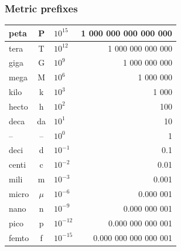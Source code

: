 \documentclass[aspectratio=169,xcolor=pdftex,dvipsnames]{beamer} %
\begin{document}
\begin{frame}
\frametitle{Metric prefixes}

\begin{tabular}{ | l | c | l | r | }
\hline
peta & P & $10^{15}$ & 1 000 000 000 000 000 \hspace{3.5cm} \\ \hline
tera & T & $10^{12}$ & 1 000 000 000 000 \hspace{3.5cm} \\ \hline
giga & G & $10^{9}$ & 1 000 000 000 \hspace{3.5cm} \\ \hline
mega & M & $10^{6}$ & 1 000 000 \hspace{3.5cm} \\ \hline
kilo & k & $10^{3}$ & 1 000  \hspace{3.5cm} \\ \hline
hecto & h & $10^{2}$ & 100 \hspace{3.5cm} \\ \hline
deca & da & $10^{1}$ & 10 \hspace{3.5cm} \\ \hline
-- & -- & $10^0$ & 1 \hspace{3.5cm} \\ \hline
deci & d & $10^{-1}$ &  0.1 \hspace{3.2cm} \\ \hline
centi & c & $10^{-2}$ & 0.01 \hspace{3cm} \\ \hline
mili & m & $10^{-3}$ & 0.001 \hspace{2.8cm} \\ \hline
micro & $\mu$ & $10^{-6}$ & 0.000 001 \hspace{2.1cm} \\ \hline
nano & n & $10^{-9}$ & 0.000 000 001 \hspace{1.4cm} \\ \hline
pico & p & $10^{-12}$ & 0.000 000 000 001 \hspace{0.7cm} \\ \hline
femto & f & $10^{-15}$ & 0.000 000 000 000 001 \hspace{0cm} \\ \hline
\end{tabular}

\end{frame}

\end{document}
